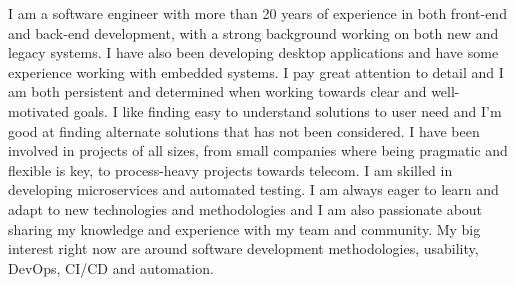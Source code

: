 \documentclass{cv-stylish}
\begin{document}
\begin{center} %



\vspace{1.0cm} %



\begin{adjustwidth}{1cm}{1cm}

%


I am a software engineer with more than 20 years of experience in
both front-end and back-end development, with a strong background
working on both new and legacy systems.
I have also been developing desktop applications and have some
experience working with embedded systems.
I pay great attention to
detail and I am both persistent and determined when working towards
clear and well-motivated goals.
I like finding easy to understand solutions to user need and I'm good
at finding alternate solutions that has not been considered.
 I have been involved in projects of
all sizes, from small companies where being pragmatic and flexible is
key, to process-heavy projects towards telecom. I am skilled in developing
microservices and automated testing. I am always
eager to learn and adapt to new technologies and methodologies and I am
also passionate about sharing my knowledge and experience with my team
and community. My big interest right now are around software development
methodologies, usability, DevOps, CI/CD and automation.


\end{adjustwidth}
\end{center}
\end{document}
